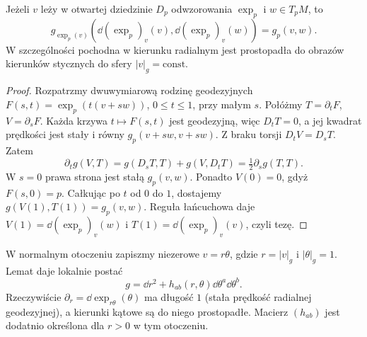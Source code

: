 \begin{lemat}[Gaussa]
\label{lem:gaussa-exp}
Jeżeli $v$ leży w otwartej dziedzinie $D_p$ odwzorowania
$\exp_p$ i
$w\in T_pM$, to
\begin{equation}\label{eq:lemat-gaussa}
 g_{\exp_p(v)}\!\left(
   \dd(\exp_p)_v(v),\dd(\exp_p)_v(w)\right)
   =g_p(v,w).
\end{equation}
W szczególności pochodna w kierunku radialnym
jest prostopadła do obrazów kierunków
stycznych do sfery $|v|_g=\mathrm{const}$.
\end{lemat}
\begin{proof}
Rozpatrzmy dwuwymiarową rodzinę geodezyjnych
$F(s,t)=\exp_p(t(v+sw))$, $0\leq t\leq1$,
przy małym $s$. Połóżmy
$T=\partial_tF$, $V=\partial_sF$.
Każda krzywa $t\mapsto F(s,t)$ jest geodezyjną,
więc $D_tT=0$, a jej kwadrat prędkości
jest stały i równy $g_p(v+sw,v+sw)$.
Z braku torsji $D_tV=D_sT$. Zatem
\[
 \partial_t g(V,T)
 =g(D_sT,T)+g(V,D_tT)
 =\tfrac12\partial_s g(T,T).
\]
W $s=0$ prawa strona jest stałą $g_p(v,w)$.
Ponadto $V(0)=0$, gdyż $F(s,0)=p$.
Całkując po $t$ od $0$ do $1$, dostajemy
$g(V(1),T(1))=g_p(v,w)$.
Reguła łańcuchowa daje
$V(1)=\dd(\exp_p)_v(w)$ i
$T(1)=\dd(\exp_p)_v(v)$, czyli tezę.
\end{proof}

W normalnym otoczeniu zapiszmy niezerowe
$v=r\theta$, gdzie $r=|v|_g$ i
$|\theta|_g=1$. Lemat daje lokalnie postać
\begin{equation}\label{eq:metryka-biegunowo-normalna}
 g=\dd r^2+h_{ab}(r,\theta)
                 \dd\theta^a\dd\theta^b.
\end{equation}
Rzeczywiście $\partial_r=\dd\exp_{r\theta}(\theta)$
ma długość $1$ (stała prędkość radialnej
geodezyjnej), a kierunki kątowe są do niego
prostopadłe. Macierz $(h_{ab})$ jest dodatnio
określona dla $r>0$ w tym otoczeniu.

